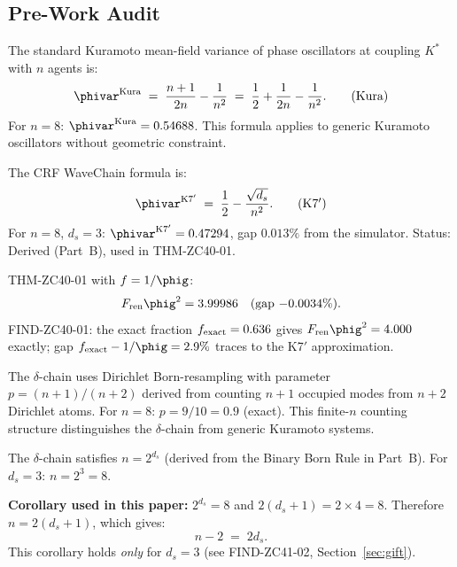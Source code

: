 \documentclass[12pt, a4paper]{article}
\begin{document}
\subsection{Pre-Work Audit}
\label{sec:pwa}

\begin{formalbox}[title={Pillar 1: Kuramoto Mean-Field Phase Variance
  (Part A)}]
The standard Kuramoto mean-field variance of phase oscillators
at coupling $K^*$ with $n$ agents is:
\[
  \phivar^{\rm Kura}
  \;=\; \frac{n+1}{2n} - \frac{1}{n^2}
  \;=\; \frac{1}{2} + \frac{1}{2n} - \frac{1}{n^2}.
  \tag{Kura}
\]
For $n = 8$: $\phivar^{\rm Kura} = 0.54688$.
This formula applies to generic Kuramoto oscillators without
geometric constraint.
\end{formalbox}

\begin{formalbox}[title={Pillar 2: K7$'$ Formula (Part B, Derived)}]
The CRF WaveChain formula is:
\[
  \phivar^{\rm K7'}
  \;=\; \frac{1}{2} - \frac{\sqrt{d_s}}{n^2}.
  \tag{K7$'$}
\]
For $n = 8$, $d_s = 3$: $\phivar^{\rm K7'} = 0.47294$, gap
$0.013\%$ from the simulator.
Status: Derived (Part~B), used in THM-ZC40-01.
\end{formalbox}

\begin{formalbox}[title={Pillar 3: THM-ZC40-01 and FIND-ZC40-01
  (ZC40)}]
THM-ZC40-01 with $f = 1/\phig$:
\[
  F_{\rm ren}\phig^2 = 3.99986
  \quad (\text{gap } {-0.0034\%}).
\]
FIND-ZC40-01: the exact fraction
$f_{\rm exact} = 0.636$ gives $F_{\rm ren}\phig^2 = 4.000$ exactly;
gap $f_{\rm exact} - 1/\phig = 2.9\%$ traces to the K7$'$
approximation.
\end{formalbox}

\begin{formalbox}[title={Pillar 4: Dirichlet Counting (Part B,
  Exact)}]
The $\delta$-chain uses Dirichlet Born-resampling with parameter
$p = (n+1)/(n+2)$ derived from counting $n+1$ occupied modes
from $n+2$ Dirichlet atoms.
For $n = 8$: $p = 9/10 = 0.9$ (exact).
This finite-$n$ counting structure distinguishes the $\delta$-chain
from generic Kuramoto systems.
\end{formalbox}

\begin{formalbox}[title={Pillar 5: Key Identity $n = 2^{d_s}$
  (Part~B, Exact)}]
The $\delta$-chain satisfies $n = 2^{d_s}$ (derived from the
Binary Born Rule in Part~B).
For $d_s = 3$: $n = 2^3 = 8$.

\medskip
\noindent\textbf{Corollary used in this paper:}
$2^{d_s} = 8$ and $2(d_s+1) = 2 \times 4 = 8$.
Therefore $n = 2(d_s+1)$, which gives:
\[
  n - 2 \;=\; 2d_s.
  \tag{Key-Cor}
\]
This corollary holds \emph{only} for $d_s = 3$
(see FIND-ZC41-02, Section~\ref{sec:gift}).
\end{formalbox}
\end{document}
